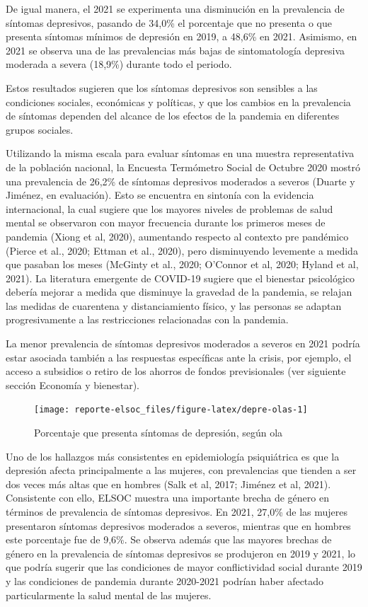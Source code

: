 \documentclass[
  12pt,
]{book}
\begin{document}
De igual manera, el 2021 se experimenta una disminución en la prevalencia de síntomas depresivos, pasando de 34,0\% el porcentaje que no presenta o que presenta síntomas mínimos de depresión en 2019, a 48,6\% en 2021. Asimismo, en 2021 se observa una de las prevalencias más bajas de sintomatología depresiva moderada a severa (18,9\%) durante todo el periodo.

Estos resultados sugieren que los síntomas depresivos son sensibles a las condiciones sociales, económicas y políticas, y que los cambios en la prevalencia de síntomas dependen del alcance de los efectos de la pandemia en diferentes grupos sociales.

Utilizando la misma escala para evaluar síntomas en una muestra representativa de la población nacional, la Encuesta Termómetro Social de Octubre 2020 mostró una prevalencia de 26,2\% de síntomas depresivos moderados a severos (Duarte y Jiménez, en evaluación). Esto se encuentra en sintonía con la evidencia internacional, la cual sugiere que los mayores niveles de problemas de salud mental se observaron con mayor frecuencia durante los primeros meses de pandemia (Xiong et al, 2020), aumentando respecto al contexto pre pandémico (Pierce et al., 2020; Ettman et al., 2020), pero disminuyendo levemente a medida que pasaban los meses (McGinty et al., 2020; O'Connor et al, 2020; Hyland et al, 2021). La literatura emergente de COVID-19 sugiere que el bienestar psicológico debería mejorar a medida que disminuye la gravedad de la pandemia, se relajan las medidas de cuarentena y distanciamiento físico, y las personas se adaptan progresivamente a las restricciones relacionadas con la pandemia.

La menor prevalencia de síntomas depresivos moderados a severos en 2021 podría estar asociada también a las respuestas específicas ante la crisis, por ejemplo, el acceso a subsidios o retiro de los ahorros de fondos previsionales (ver siguiente sección Economía y bienestar).

\begin{figure}

{\centering \texttt{[image: reporte-elsoc\_files/figure-latex/depre-olas-1]} 

}

\caption{Porcentaje que presenta síntomas de depresión, según ola}\label{fig:depre-olas}
\end{figure}

Uno de los hallazgos más consistentes en epidemiología psiquiátrica es que la depresión afecta principalmente a las mujeres, con prevalencias que tienden a ser dos veces más altas que en hombres (Salk et al, 2017; Jiménez et al, 2021). Consistente con ello, ELSOC muestra una importante brecha de género en términos de prevalencia de síntomas depresivos. En 2021, 27,0\% de las mujeres presentaron síntomas depresivos moderados a severos, mientras que en hombres este porcentaje fue de 9,6\%. Se observa además que las mayores brechas de género en la prevalencia de síntomas depresivos se produjeron en 2019 y 2021, lo que podría sugerir que las condiciones de mayor conflictividad social durante 2019 y las condiciones de pandemia durante 2020-2021 podrían haber afectado particularmente la salud mental de las mujeres.
\end{document}
